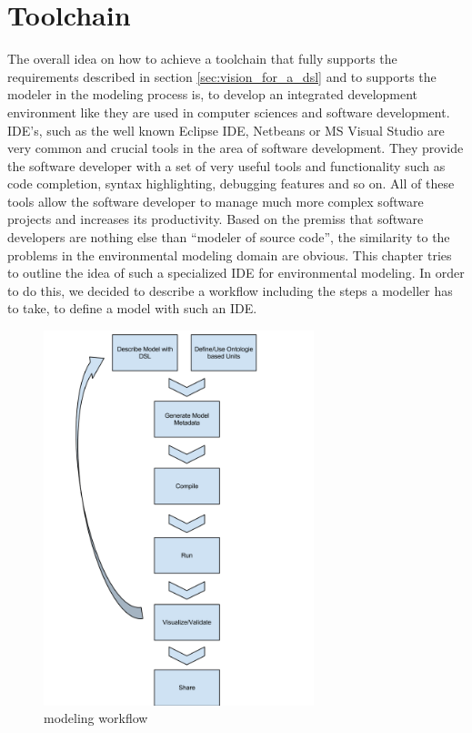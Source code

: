 \chapter{Toolchain} \label{chap:toolchain}

The overall idea on how to achieve a toolchain that fully supports the requirements described in section \ref{sec:vision_for_a_dsl} and to supports the modeler in the modeling process is, to develop an integrated development environment like they are used in computer sciences and software development. IDE’s, such as the well known Eclipse IDE, Netbeans or MS Visual Studio  are very common and crucial tools in the area of software development. They provide the software developer with a set of very useful tools and functionality such as code completion, syntax highlighting, debugging features and so on. All of these tools allow the software developer to manage much more complex software projects and increases its productivity. Based on the premiss that software developers are nothing else than “modeler of source code”, the similarity to the problems in the environmental modeling domain are obvious. This chapter tries to outline the idea of such a specialized IDE for environmental modeling. In order to do this, we decided to describe a workflow including the steps a modeller has to take, to define a model with such an IDE.
\begin{figure}[h]
	\centering
	\includegraphics[width=0.7\textwidth]{pics/toolchain/modeling_workflow.png}
	\caption{modeling workflow \label{fig:modeling_workflow}	}
\end{figure}

